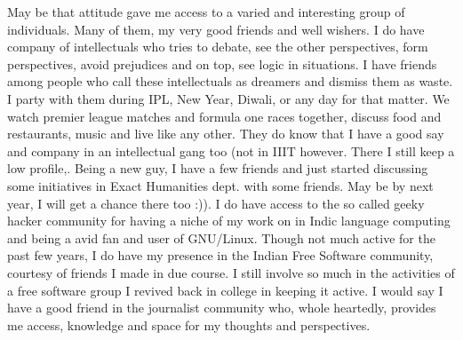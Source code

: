 {May be that attitude gave me access to a varied and interesting group of individuals. Many of them, 
my very good friends and well wishers. I do have company of intellectuals who tries to debate, see 
the other perspectives, form perspectives, avoid prejudices and on top, see logic in situations. I 
have friends among people who call these intellectuals as dreamers and dismiss them as waste. I party 
with them during IPL, New Year, Diwali, or any day for that matter. We watch premier league matches 
and formula one races together, discuss food and restaurants, music and live like any other. They do 
know that I have a good say and company in an intellectual gang too (not in IIIT however. There I still keep a low
profile,. Being a new guy, I have a few friends and just started discussing some initiatives in Exact
Humanities dept. with some friends. May be by next year, I will get a chance there too :)). I do 
have access to the so called geeky hacker community for having a niche of my work on in Indic 
language computing and being a avid fan and user of GNU/Linux. Though not much active for the past 
few years, I do have my presence in the Indian Free Software community, courtesy of friends I made in 
due course. I still involve so much in the activities of a free software group I revived back in 
college in keeping it active. I would say I have a good friend in the journalist community who, whole
heartedly, provides me access, knowledge and space for my thoughts and perspectives.  


}
